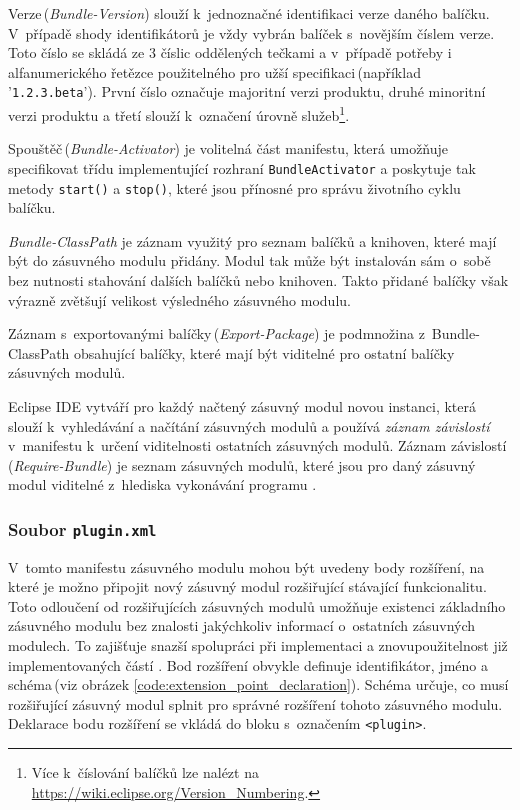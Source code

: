       Verze\,(\emph{Bundle-Version}) slouží k~jednoznačné identifikaci verze daného balíčku. V~případě shody identifikátorů je vždy vybrán balíček s~novějším číslem verze. Toto číslo se skládá ze 3 číslic oddělených tečkami a v~případě potřeby i alfanumerického řetězce použitelného pro užší specifikaci\,(například '\texttt{1.2.3.beta}'). První číslo označuje majoritní verzi produktu, druhé minoritní verzi produktu a třetí slouží k~označení úrovně služeb\footnote{Více k~číslování balíčků lze nalézt na \url{https://wiki.eclipse.org/Version_Numbering}.}.

      Spouštěč\,(\emph{Bundle-Activator}) je volitelná část manifestu, která umožňuje specifikovat třídu implementující rozhraní \texttt{BundleActivator} a poskytuje tak metody \texttt{start()} a \texttt{stop()}, které jsou přínosné pro správu životního cyklu balíčku.

      \emph{Bundle-ClassPath} je záznam využitý pro seznam balíčků a knihoven, které mají být do zásuvného modulu přidány. Modul tak může být instalován sám o~sobě bez nutnosti stahování dalších balíčků nebo knihoven. Takto přidané balíčky však výrazně zvětšují velikost výsledného zásuvného modulu.

      Záznam s~exportovanými balíčky\,(\emph{Export-Package}) je podmnožina z~Bundle-ClassPath obsahující balíčky, které mají být viditelné pro ostatní balíčky zásuvných modulů.

      Eclipse IDE vytváří pro každý načtený zásuvný modul novou instanci, která slouží k~vyhledávání a načítání zásuvných modulů a používá \emph{záznam závislostí} v~manifestu k~určení viditelnosti ostatních zásuvných modulů. Záznam závislostí\,(\emph{Require-Bundle}) je seznam zásuvných modulů, které jsou pro daný zásuvný modul viditelné z~hlediska vykonávání programu \cite{Plugins}.

      \subsubsection{Soubor \texttt{plugin.xml}}
      V~tomto manifestu zásuvného modulu mohou být uvedeny body rozšíření, na které je možno připojit nový zásuvný modul rozšiřující stávající funkcionalitu. Toto odloučení od rozšiřujících zásuvných modulů umožňuje existenci základního zásuvného modulu bez znalosti jakýchkoliv informací o~ostatních zásuvných modulech. To zajišťuje snazší spolupráci při implementaci a znovupoužitelnost již implementovaných částí \cite{Plugins}. Bod rozšíření obvykle definuje identifikátor, jméno a schéma\,(viz obrázek \ref{code:extension_point_declaration}). Schéma určuje, co musí rozšiřující zásuvný modul splnit pro správné rozšíření tohoto zásuvného modulu. Deklarace bodu rozšíření se vkládá do bloku s~označením \texttt{<plugin>}. 

